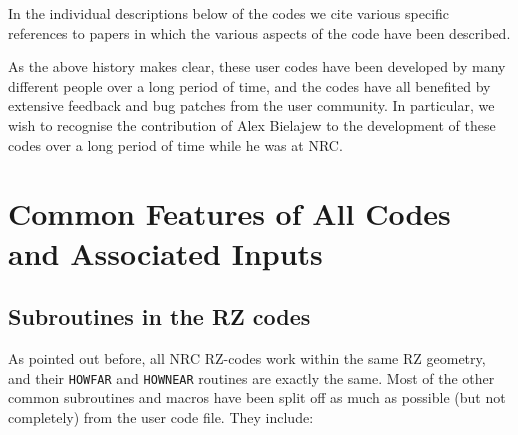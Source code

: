 \documentclass[12pt,twoside]{article}  %
\begin{document}
In the individual descriptions below of the codes we cite various specific
references to papers in which the various aspects of the code have been
described.

As the above history makes clear, these user codes have been developed
by many different people over a long period of time, and the codes
have all benefited by extensive feedback and bug patches from the user
community. In particular, we wish to recognise the contribution of Alex
Bielajew to the development of these codes over a long period of time
while he was at NRC.

\renewcommand{\leftmark}{{COMMON FEATURES}}
\section[Common Features]{Common Features of All Codes and Associated Inputs}
\label{Common}
\subsection{Subroutines in the RZ codes}

As pointed out before, all NRC RZ-codes work within the same RZ 
geometry, and their \verb+HOWFAR+ and \verb+HOWNEAR+ routines are 
exactly the same. Most of the other common subroutines and macros
have been split off as much as possible (but not completely) 
from the user code file. They include:
\end{document}
